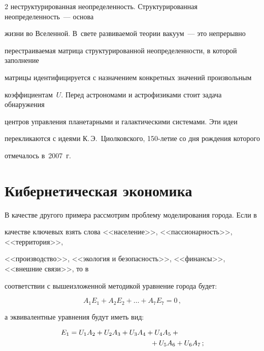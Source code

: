\begin{multicols}{2}
неструктурированная неопределенность. Структурированная неопределенность~--- основа 


жизни во Вселенной. В~свете развиваемой теории вакуум~--- это непрерывно 


перестраиваемая матрица структурированной неопределенности, в которой заполнение 


матрицы идентифицируется с назначением конкретных значений произвольным 


коэффициентам~$U$. Перед астрономами и астрофизиками стоит задача обнаружения 


центров управ\-ле\-ния планетарными и галактическими сис\-те\-мами. Эти идеи 


перекликаются с идеями К.\,Э.~Циолковского, 150-ле\-тие со дня рождения которого 


отмечалось в~2007~г.





\section{Кибернетическая экономика}





      В качестве другого примера рассмотрим проблему моделирования города. Если в 


качестве ключевых взять слова <<население>>, <<пассионарность>>, <<территория>>, 


<<производство>>, <<экология и безопасность>>, <<финансы>>, <<внешние связи>>, то в 


соответствии с вышеизложенной методикой уравнение города будет:


      \begin{equation}


      A_1E_1+A_2E_2+\ldots+A_7E_7=0\,,


      \label{e18-ign}


      \end{equation}


а эквивалентные уравнения будут иметь вид:


\begin{align*}


E_1 & = U_1A_2 + U_2A_3 + U_3A_4 + U_4A_5 +{}\\


&\hspace{40mm}{}+ U_5A_6 + U_6A_7\,;\\



\end{align*}
\end{multicols}
